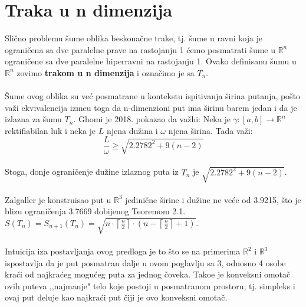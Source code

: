 \documentclass[11pt,letter]{article}
\begin{document}
\section[Traka u n dimenzija]{Traka u n dimenzija}
\bigskip
 Sli\v cno problemu \v sume oblika beskona\v cne trake, tj. \v sume u ravni koja je ograni\v cena sa dve paralelne prave na rastojanju 1 \' cemo posmatrati \v sume u $\mathbb{R}^n$ ograni\v cene sa dve paralelne hiperravni na rastojanju 1. Ovako definisanu \v sumu u $\mathbb{R}^n$ zovimo \textbf{trakom u n dimenzija} i ozna\v cimo je sa $T_n$.
\\
\smallskip
\\
\indent \v Sume ovog oblika su ve\' c posmatrane u kontekstu ispitivanja \v sirina putanja, po\v sto va\v zi ekvivalencija izme\dj u toga da n-dimenzioni put ima \v sirinu barem jedan i da je izlazna za \v sumu $T_n$. Ghomi je 2018. pokazao da va\v zhi:
\teo[Ghomi] Neka je $\gamma: [a,b]\to \mathbb{R}^n$ rektifiabilan luk i neka je $L$ njena du\v zina i $\omega$ njena \v sirina. Tada va\v zi:
$$\frac{L}{\omega}\geqslant \sqrt{2.2782^2+9(n-2)}$$
\\
\indent Stoga, donje ograni\v cenje du\v zine izlaznog puta iz $T_n$ je $ \sqrt{2.2782^2+9(n-2)}$.
\\
\\
Zalgaller je konstruisao put u $\mathbb{R}^3$ jedini\v cne \v sirine i du\v zine ne ve\' ce od 3.9215, \v sto je blizu ograni\v cenja 3.7669 dobijenog Teoremom 2.1.
\\
\pred $S(T_n)=S_{n+1}(T_n)=\sqrt{n\cdot\left\lceil\frac{n}{2}\right\rceil\cdot\left( n-\left\lceil\frac{n}{2}\right\rceil+1\right)}$.
\\
\\
\indent Intuicija iza postavljanja ovog predloga je to \v sto se na primerima $\mathbb{R}^2$ i $\mathbb{R}^3$ ispostavlja da je put posmatran dalje u ovom poglavlju sa 3, odnosno 4 osobe kra\' ci od najkra\' ceg mogu\' ceg puta za jednog \v coveka. Tako\dj e je konveksni omota\v c ovih puteva ,,najmanje" telo koje postoji u posmatranom prostoru, tj. simpleks i ovaj put deluje kao najkra\' ci put \v ciji je ovo konveksni omota\v c.


\smallskip
\end{document}
